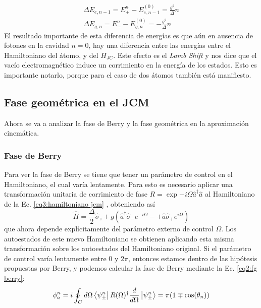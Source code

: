 \begin{equation}
    \begin{aligned}
        \Delta E_{e,n-1}=E_+^n-E^{(0)}_{e,n-1}=\frac{g^2}{\Delta}n \\
        \Delta E_{g,n}=E_-^n-E^{(0)}_{g,n}=-\frac{g^2}{\Delta}n
    \end{aligned}
\end{equation}
El resultado importante de esta diferencia de energías es que aún en ausencia de fotones en la cavidad $n=0$, hay una diferencia entre las energías entre el Hamiltoniano del átomo, y del $H_{JC}$. Este efecto es el \textit{Lamb Shift} y nos dice que el vac\'io electromagnético induce un corrimiento en la energ\'ia de los estados. Esto es importante notarlo, porque para el caso de dos átomos también est\'a manifiesto.

\subsection{Fase geométrica en el JCM}
Ahora se va a analizar la fase de Berry y la fase geométrica en la aproximación cinemática.
\subsubsection{Fase de Berry}
Para ver la fase de Berry se tiene que tener un parámetro de control en el Hamiltoniano, el cual varía lentamente. Para esto es necesario aplicar una transformación unitaria de corrimiento de fase $R=\exp{-i\Omega \hat a^\dagger \hat a}$ al Hamiltoniano de la Ec. \ref{eq3:hamiltoniano jcm} , obteniendo así
\begin{equation}
    \hat H=\frac{\Delta}{2}\hat \sigma_z+g(\hat a^\dagger \hat \sigma_-e^{-i\Omega}-+\hat a\hat \sigma_+e^{i\Omega})
\end{equation}
que ahora depende explícitamente del parámetro externo de control $\Omega$. Los autoestados de este nuevo Hamiltoniano se obtienen aplicando esta misma transformación sobre los autoestados del Hamiltoniano original. Si el parámetro de control varía lentamente entre 0 y $2\pi$, entonces estamos dentro de las hipótesis propuestas por Berry, y podemos calcular la fase de Berry mediante la Ec. \ref{eq2:fg berry}:
\begin{equation}
    \phi_a^n=i\oint_Cd\Omega\bra{\psi_\pm^n}R(\Omega)^\dagger \frac{d}{d\Omega}\ket{\psi_\pm^n}=\pi(1\mp \cos(\theta_n))
\end{equation}

